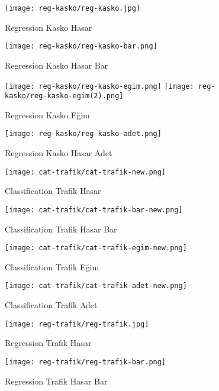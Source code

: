\documentclass[titlepage, a4paper, 14pt]{extarticle} %
\begin{document}
\begin{figure}[H]
\centering
\texttt{[image: reg-kasko/reg-kasko.jpg]}
\caption{Regression Kasko Hasar}
\end{figure}

\begin{figure}[H]
\centering
\texttt{[image: reg-kasko/reg-kasko-bar.png]}
\caption{Regression Kasko Hasar Bar}
\end{figure}

\begin{figure}[H]
\centering
\texttt{[image: reg-kasko/reg-kasko-egim.png]}
\texttt{[image: reg-kasko/reg-kasko-egim(2).png]}
\caption{Regression Kasko Eğim}
\end{figure}

\begin{figure}[H]
\centering
\texttt{[image: reg-kasko/reg-kasko-adet.png]}
\caption{Regression Kasko Hasar Adet}
\end{figure}


\begin{figure}[H]
\centering
\texttt{[image: cat-trafik/cat-trafik-new.png]}
\caption{Classification Trafik Hasar}
\end{figure}

\begin{figure}[H]
\centering
\texttt{[image: cat-trafik/cat-trafik-bar-new.png]}
\caption{Classification Trafik Hasar Bar}
\end{figure}

\begin{figure}[H]
\centering
\texttt{[image: cat-trafik/cat-trafik-egim-new.png]}
\caption{Classification Trafik Eğim}
\end{figure}

\begin{figure}[H]
\centering
\texttt{[image: cat-trafik/cat-trafik-adet-new.png]}
\caption{Classification Trafik Adet}
\end{figure}


\begin{figure}[H]
\centering
\texttt{[image: reg-trafik/reg-trafik.jpg]}
\caption{Regression Trafik Hasar}
\end{figure}

\begin{figure}[H]
\centering
\texttt{[image: reg-trafik/reg-trafik-bar.png]}
\caption{Regression Trafik Hasar Bar}
\end{figure}
\end{document}
